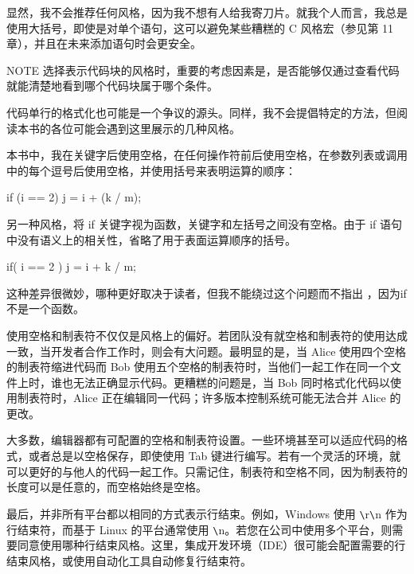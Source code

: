 显然，我不会推荐任何风格，因为我不想有人给我寄刀片。就我个人而言，我总是使用大括号，即使是对单个语句，这可以避免某些糟糕的 C 风格宏（参见第 11 章），并且在未来添加语句时会更安全。

\begin{myNotic}{NOTE}
选择表示代码块的风格时，重要的考虑因素是，是否能够仅通过查看代码就能清楚地看到哪个代码块属于哪个条件。
\end{myNotic}


代码单行的格式化也可能是一个争议的源头。同样，我不会提倡特定的方法，但阅读本书的各位可能会遇到这里展示的几种风格。

本书中，我在关键字后使用空格，在任何操作符前后使用空格，在参数列表或调用中的每个逗号后使用空格，并使用括号来表明运算的顺序：

\begin{cpp}
if (i == 2) {
    j = i + (k / m);
}
\end{cpp}

另一种风格，将 if 关键字视为函数，关键字和左括号之间没有空格。由于 if 语句中没有语义上的相关性，省略了用于表面运算顺序的括号。

\begin{cpp}
if( i == 2 ) {
    j = i + k / m;
}
\end{cpp}

这种差异很微妙，哪种更好取决于读者，但我不能绕过这个问题而不指出 ，因为if不是一个函数。


使用空格和制表符不仅仅是风格上的偏好。若团队没有就空格和制表符的使用达成一致，当开发者合作工作时，则会有大问题。最明显的是，当 Alice 使用四个空格的制表符缩进代码而 Bob 使用五个空格的制表符时，当他们一起工作在同一个文件上时，谁也无法正确显示代码。更糟糕的问题是，当 Bob 同时格式化代码以使用制表符时，Alice 正在编辑同一代码；许多版本控制系统可能无法合并 Alice 的更改。

大多数，编辑器都有可配置的空格和制表符设置。一些环境甚至可以适应代码的格式，或者总是以空格保存，即使使用 Tab 键进行编写。若有一个灵活的环境，就可以更好的与他人的代码一起工作。只需记住，制表符和空格不同，因为制表符的长度可以是任意的，而空格始终是空格。

最后，并非所有平台都以相同的方式表示行结束。例如，Windows 使用 \verb|\|r\verb|\|n 作为行结束符，而基于 Linux 的平台通常使用 \verb|\|n。若您在公司中使用多个平台，则需要同意使用哪种行结束风格。这里，集成开发环境（IDE）很可能会配置需要的行结束风格，或使用自动化工具自动修复行结束符。

